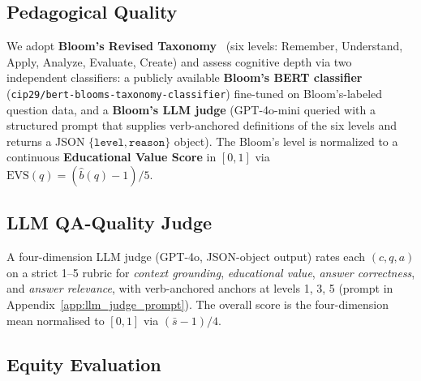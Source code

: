 \documentclass[11pt]{article}
\theoremstyle{plain}
\theoremstyle{definition}
\theoremstyle{remark}
\begin{document}
\subsection{Pedagogical Quality}
\label{sec:pedagogical}

We adopt \textbf{Bloom's Revised
Taxonomy}~\citep{anderson2001taxonomy} (six levels:
Remember, Understand, Apply, Analyze, Evaluate,
Create) and assess cognitive depth via two
independent classifiers: a publicly available
\textbf{Bloom's BERT classifier}
(\texttt{cip29/bert-blooms-taxonomy-classifier})
fine-tuned on Bloom's-labeled question data, and a
\textbf{Bloom's LLM judge} (GPT-4o-mini queried with
a structured prompt that supplies verb-anchored
definitions of the six levels and returns a JSON
$\{\texttt{level}, \texttt{reason}\}$ object). The
Bloom's level is normalized to a continuous
\textbf{Educational Value Score} in $[0, 1]$ via
$\mathrm{EVS}(q) = (\hat{b}(q) - 1) / 5$.

\subsection{LLM QA-Quality Judge}
\label{sec:llm_judge}

A four-dimension LLM judge (GPT-4o, JSON-object output)
rates each $(c, q, a)$ on a strict 1--5 rubric for
\emph{context grounding}, \emph{educational value},
\emph{answer correctness}, and \emph{answer relevance},
with verb-anchored anchors at levels 1, 3, 5
(prompt in Appendix~\ref{app:llm_judge_prompt}).
The overall score is the four-dimension mean
normalised to $[0, 1]$ via $(\bar{s} - 1)/4$.

\subsection{Equity Evaluation}
\label{sec:equity}
\end{document}
